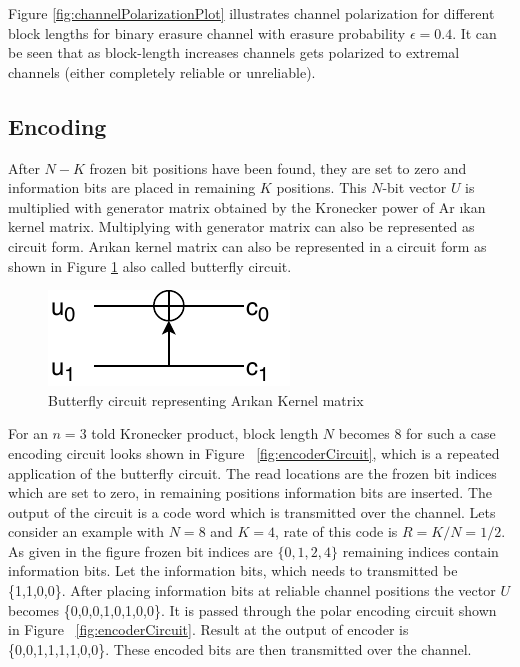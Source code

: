 Figure \ref{fig:channelPolarizationPlot} illustrates channel polarization for different block lengths for binary erasure channel with erasure probability $\epsilon = 0.4$. It can be seen that as block-length increases channels gets polarized to extremal channels (either completely reliable or unreliable).

\subsection{Encoding} \label{polarEncoding}
After $N-K$ frozen bit positions have been found, they are set to zero and information bits are placed in remaining $K$ positions.
This $N$-bit vector $U$ is multiplied with generator matrix obtained by the Kronecker power of Ar \i kan kernel matrix. Multiplying with generator matrix can also be represented as circuit form. Ar\i kan kernel matrix can also be represented in a circuit form as shown in Figure \ref{fig:butterFlyCicuit} also called butterfly circuit.

\begin{figure}[h]
	\centering
	\includegraphics{./figures/ButterFlyCircuit.pdf}
	\caption{Butterfly circuit representing Ar\i kan Kernel matrix}
	\label{fig:butterFlyCicuit}
\end{figure}

For an $n = 3$ told Kronecker product, block length $N$ becomes 8 for such a case encoding circuit looks shown in  Figure ~\ref{fig:encoderCircuit}, which is a repeated application of the butterfly circuit. The read locations are the frozen bit indices which are set to zero, in remaining positions information bits are inserted. The output of the circuit is a code word which is transmitted over the channel. Lets consider an example with $N = 8$ and $K = 4$, rate of this code is $R = K/N = 1/2$. As given in the figure frozen bit indices are ${\{0,1,2,4\}}$ remaining indices contain information bits. Let the information bits, which needs to transmitted be \{1,1,0,0\}. After placing information bits at reliable channel positions the vector $U$ becomes \{0,0,0,1,0,1,0,0\}. It is passed through the polar encoding circuit shown in Figure ~\ref{fig:encoderCircuit}. Result at the output of encoder is \{0,0,1,1,1,1,0,0\}. These encoded bits are then transmitted over the channel.

